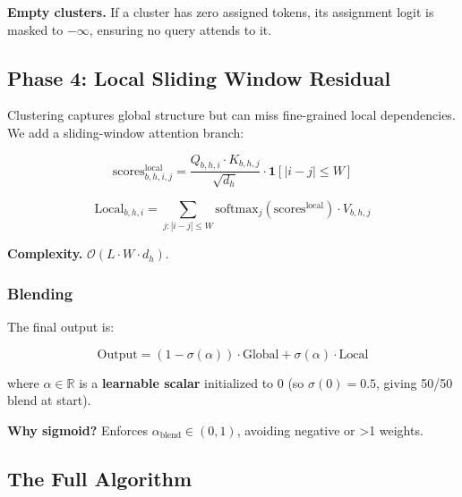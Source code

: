 \textbf{Empty clusters.} If a cluster has zero assigned tokens, its assignment 
logit is masked to $-\infty$, ensuring no query attends to it.

\subsection{Phase 4: Local Sliding Window Residual}

Clustering captures global structure but can miss fine-grained local 
dependencies. We add a sliding-window attention branch:

\[
\text{scores}^\text{local}_{b,h,i,j} = \frac{Q_{b,h,i} \cdot K_{b,h,j}}{\sqrt{d_h}} \cdot \mathbf{1}[|i - j| \leq W]
\]

\[
\text{Local}_{b,h,i} = \sum_{j: |i-j| \leq W} \text{softmax}_j(\text{scores}^\text{local}) \cdot V_{b,h,j}
\]

\textbf{Complexity.} $\mathcal{O}(L \cdot W \cdot d_h)$.

\subsubsection{Blending}

The final output is:

\[
\text{Output} = (1 - \sigma(\alpha)) \cdot \text{Global} + \sigma(\alpha) \cdot \text{Local}
\]

where $\alpha \in \mathbb{R}$ is a \textbf{learnable scalar} initialized to 0 
(so $\sigma(0) = 0.5$, giving 50/50 blend at start).

\textbf{Why sigmoid?} Enforces $\alpha_\text{blend} \in (0, 1)$, avoiding 
negative or >1 weights.

\subsection{The Full Algorithm}

